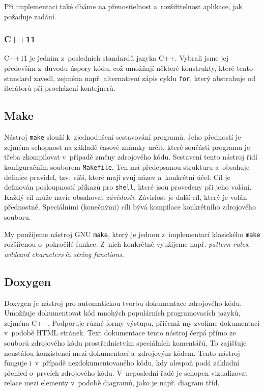 \documentclass[thesis=B,czech,hidelinks]{thesis}[2012/06/26]
\begin{document}
Při implementaci také dbáme na přenositelnost a~rozšiřitelnost aplikace, jak požaduje zadání.

\subsubsection{C++11}

C++11 je jedním z~posledních standardů jazyka C++. Vybrali jsme jej především z~důvodu úspory kódu, což umožňují některé konstrukty, které tento standard zavedl, zejména např. alternativní zápis cyklu \texttt{for}, který abstrahuje od iterátorů při procházení kontejnerů\cite{cpp}.

\subsection{Make}

Nástroj \texttt{make} slouží k~zjednodušení sestavování programů. Jeho předností je zejména schopnost na základě časové známky určit, které součásti programu je třeba zkompilovat v~případě změny zdrojového kódu. Sestavení tento nástroj řídí konfiguračním souborem \texttt{Makefile}. Ten má předepsanou strukturu a~obsahuje definice pravidel, tzv. \emph{cílů}, které mají svůj název a~konkrétní účel. Cíl je definován posloupností příkazů pro \texttt{shell}, které jsou provedeny při jeho volání. Každý cíl může navíc obsahovat \emph{závislosti}. Závislost je další cíl, který je volán přednostně. Speciálními (konečnými) cíli bývá kompilace konkrétního zdrojového souboru.

My použijeme nástroj GNU \texttt{make}, který je jednou z~implementací klasického \texttt{make} rozšířenou o~pokročilé funkce. Z~nich konkrétně využijeme např. \emph{pattern rules}, \emph{wildcard characters} či \emph{string functions}\cite{gmake}.

\subsection{Doxygen}

Doxygen je nástroj pro automatickou tvorbu dokumentace zdrojového kódu. Umožňuje dokumentovat kód mnohých populárních programovacích jazyků, zejména C++. Podporuje různé formy výstupu, přičemž my zvolíme dokumentaci v~podobě HTML stránek. Text dokumentace tento nástroj čerpá přímo ze souborů zdrojového kódu prostřednictvím speciálních komentářů. To zajišťuje neustálou konzistenci mezi dokumentací a~zdrojovým kódem. Tento nástroj funguje i~v~případě nezdokumentovaného kódu, kdy alespoň podá základní přehled o~prvcích zdrojového kódu. V~neposlední řadě je schopen vizualizovat relace mezi elementy v~podobě diagramů, jako je např. diagram tříd\cite{doxygen}.
\end{document}
